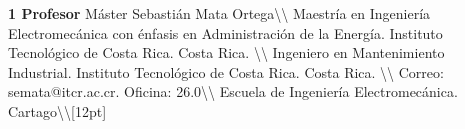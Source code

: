 \documentclass[letterpaper]{article}%
\begin{document}
\begin{tcolorbox}[
blanker,
width=0.78\textwidth,enlarge left by=0.24\textwidth,
before skip=6pt,
breakable,
overlay unbroken and first={%
    \node[inner sep=0pt,outer sep=0pt,text width=0.22\textwidth,
    align=none,
    below right]
    at ([xshift=-0.24\textwidth]frame.north west)
{
\hspace*{0mm}\fontsize{12}{14}\selectfont \textbf{\textcolor{parte}{7 Bibliografía}}
};}]

\nocite{hernandez2013dibujo}
\nocite{lieu2011dibujo}
\nocite{bogoliubov1988dibujo}
\nocite{bogoliubov1989tareas}
\printbibliography[heading=none] 
\end{tcolorbox}
%
\vspace*{10mm}%
\par\hspace*{4mm}\fontsize{12}{20}\selectfont \textbf{\textcolor{parte}{1 Profesor}}%
\newline%
Máster Sebastián Mata Ortega\textbackslash{}\textbackslash{}\newline%
Maestría en Ingeniería Electromecánica con énfasis en Administración de la Energía. Instituto Tecnológico de Costa Rica. Costa Rica.  \textbackslash{}\textbackslash{}\newline%
Ingeniero en Mantenimiento Industrial. Instituto Tecnológico de Costa Rica. Costa Rica.  \textbackslash{}\textbackslash{}\newline%
Correo: semata@itcr.ac.cr. Oficina: 26.0\textbackslash{}\textbackslash{}\newline%
Escuela de Ingeniería Electromecánica. Cartago\textbackslash{}\textbackslash{}{[}12pt{]}\newline%
%
\end{document}

